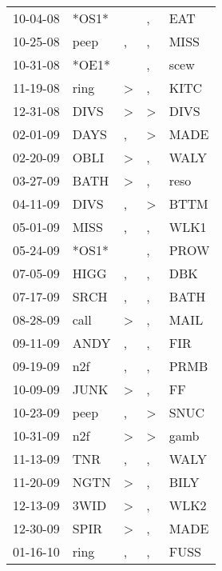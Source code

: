 \begin{supertabular}{lllll}
 10-04-08 &  *OS1* &                  &                , &    EAT \\
 10-25-08 &   peep &                , &                , &   MISS \\
 10-31-08 &  *OE1* &                  &                , &   scew \\
 11-19-08 &   ring &     \textgreater &                , &   KITC \\
 12-31-08 &   DIVS &     \textgreater &     \textgreater &   DIVS \\
 02-01-09 &   DAYS &                , &     \textgreater &   MADE \\
 02-20-09 &   OBLI &     \textgreater &                , &   WALY \\
 03-27-09 &   BATH &     \textgreater &                , &   reso \\
 04-11-09 &   DIVS &                , &     \textgreater &   BTTM \\
 05-01-09 &   MISS &                , &                , &   WLK1 \\
 05-24-09 &  *OS1* &                  &                , &   PROW \\
 07-05-09 &   HIGG &                , &                , &    DBK \\
 07-17-09 &   SRCH &                , &                , &   BATH \\
 08-28-09 &   call &     \textgreater &                , &   MAIL \\
 09-11-09 &   ANDY &                , &                , &    FIR \\
 09-19-09 &    n2f &                , &                , &   PRMB \\
 10-09-09 &   JUNK &     \textgreater &                , &     FF \\
 10-23-09 &   peep &                , &     \textgreater &   SNUC \\
 10-31-09 &    n2f &     \textgreater &     \textgreater &   gamb \\
 11-13-09 &    TNR &                , &                , &   WALY \\
 11-20-09 &   NGTN &     \textgreater &                , &   BILY \\
 12-13-09 &   3WID &     \textgreater &                , &   WLK2 \\
 12-30-09 &   SPIR &     \textgreater &                , &   MADE \\
 01-16-10 &   ring &                , &                , &   FUSS \\

\end{supertabular}
